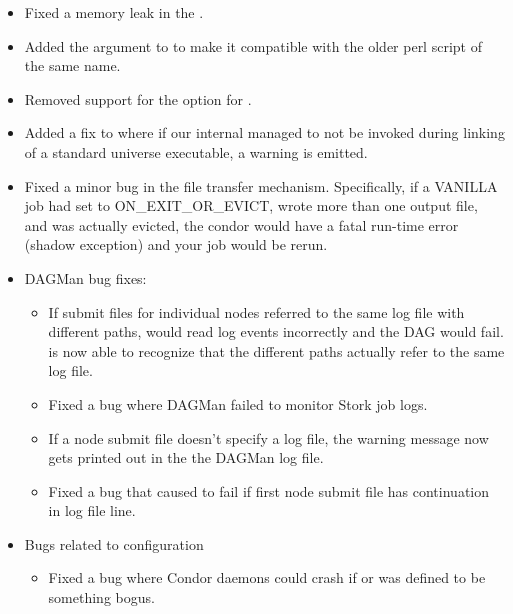 \begin{itemize}
\item Fixed a memory leak in the .

\item Added the  argument to  to make it
	compatible with the older perl script of the same name.

\item Removed support for the  option for .

\item Added a fix to  where if our internal  managed
	to not be invoked during linking of a standard universe executable, 
	a warning is emitted.

\item Fixed a minor bug in the file transfer mechanism.  Specifically,
  if a VANILLA job had  set to
  ON\_EXIT\_OR\_EVICT, wrote more than one output file, and was
  actually evicted, the condor  would have a fatal
  run-time error (shadow exception) and your job would be rerun.

\item DAGMan bug fixes:
\begin{itemize}
  \item If submit files for individual nodes referred to the same log
    file with different paths,  would read log events
    incorrectly and the DAG would fail.
     is now able to recognize that the different paths
    actually refer to the same log file.

  \item Fixed a bug where DAGMan failed to monitor Stork job logs.

  \item If a node submit file doesn't specify a log file, the warning
	message now gets printed out in the the DAGMan log file.

  \item Fixed a bug that caused  to fail if first node
        submit file has continuation in log file line.


\end{itemize}

\item Bugs related to configuration
\begin{itemize}
  \item Fixed a bug where Condor daemons could crash if
     or  was defined to
    be something bogus.


\end{itemize}
\end{itemize}
